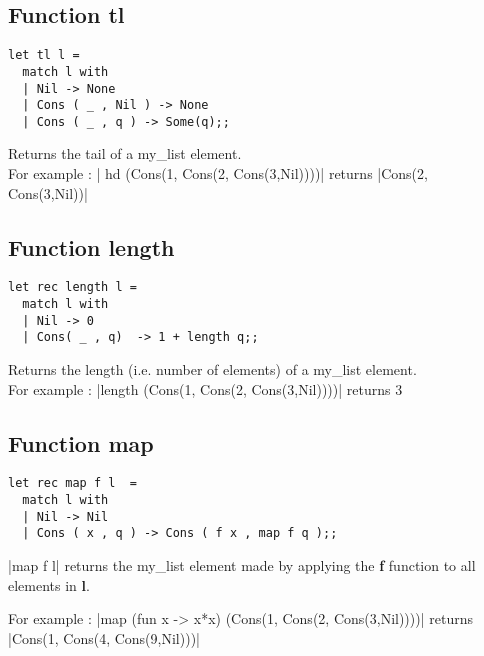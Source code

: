 \documentclass{article}
\begin{document}
\medskip


\subsection{Function tl}


\begin{verbatim}
let tl l =
  match l with
  | Nil -> None
  | Cons ( _ , Nil ) -> None
  | Cons ( _ , q ) -> Some(q);;

\end{verbatim}

Returns the tail of a my\_list element.\\

For example : | hd (Cons(1, Cons(2, Cons(3,Nil))))| returns |Cons(2, Cons(3,Nil))|
\medskip

\newpage

\subsection{Function length}

\begin{verbatim}
let rec length l =
  match l with
  | Nil -> 0
  | Cons( _ , q)  -> 1 + length q;;
\end{verbatim}
Returns the length (i.e. number of elements) of a my\_list element.\\

For example : |length (Cons(1, Cons(2, Cons(3,Nil))))| returns 3\\

\subsection{Function map}

\begin{verbatim}
let rec map f l  =
  match l with
  | Nil -> Nil
  | Cons ( x , q ) -> Cons ( f x , map f q );;
\end{verbatim}

|map f l| returns the my\_list element made by applying the \textbf{f} function to all elements in \textbf{l}.

For example : |map (fun x -> x*x) (Cons(1, Cons(2, Cons(3,Nil))))| returns  |Cons(1, Cons(4, Cons(9,Nil)))|
%
\end{document}
